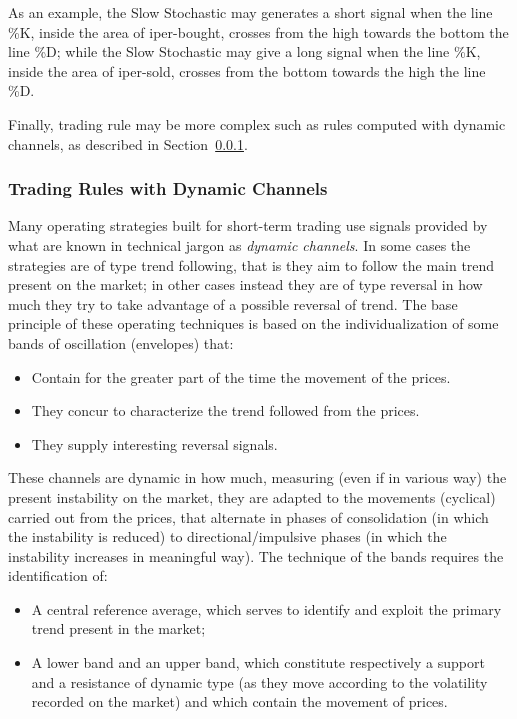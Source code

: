 \noindent As an example, the Slow Stochastic may generates a short signal when the line \%K, inside the area of iper-bought, crosses from the high towards the bottom the line \%D; while the Slow Stochastic may give a long signal when the line \%K, inside the area of iper-sold, crosses from the bottom towards the high the line \%D.

Finally, trading rule may be more complex such as rules computed with dynamic channels, as described in Section~\ref{sec:dynCha}.


\subsubsection{Trading Rules with Dynamic Channels}
\label{sec:dynCha}
Many operating strategies built for short-term trading use signals provided by what are known in technical jargon as \textit{dynamic channels}. In some cases the strategies are of type trend following, that is they aim to follow the main trend present on the market; in other cases instead they are of type reversal in how much they try to take advantage of a possible reversal of trend.
The base principle of these operating techniques is based on the individualization of some bands of oscillation (envelopes) that:

\begin{itemize}
\setlength\itemsep{0.3em}
\item Contain for the greater part of the time the movement of the prices.
\item They concur to characterize the trend followed from the prices.
\item They supply interesting reversal signals.
\end{itemize}

These channels are dynamic in how much, measuring (even if in various way) the present instability on the market, they are adapted to the movements (cyclical) carried out from the prices, that alternate in phases of consolidation (in which the instability is reduced) to directional/impulsive phases (in which the instability increases in meaningful way). The technique of the bands requires the identification of:

\begin{itemize}
\setlength\itemsep{0.3em}
\item A central reference average, which serves to identify and exploit the primary trend present in the market;
\item A lower band and an upper band, which constitute respectively a support and a resistance of dynamic type (as they move according to the volatility recorded on the market) and which contain the movement of prices.
\end{itemize}

